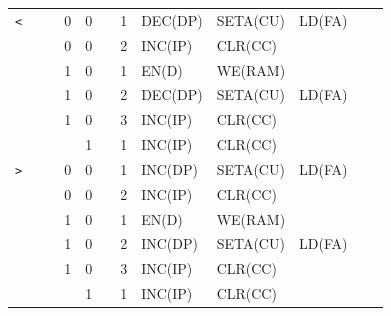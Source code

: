 \begin{footnotesize}
\begin{longtable}[c] {c|ccccc|c|lllll}
    \rowcolor{Gray}  \texttt{<}   &   &   & 0 & 0     &      & 1     & DEC(DP)   & SETA(CU) & LD(FA)  &        &                \\
    \rowcolor{Gray}               &   &   & 0 & 0     &      & 2     & INC(IP)  & CLR(CC)   &         &        &                \\    
    \rowcolor{White}              &   &   & 1 & 0     &      & 1     & EN(D)    & WE(RAM)  &         &        &                \\
    \rowcolor{White}              &   &   & 1 & 0     &      & 2     & DEC(DP)   & SETA(CU) & LD(FA)  &        &                \\
    \rowcolor{White}              &   &   & 1 & 0     &      & 3     & INC(IP)  & CLR(CC)   &         &        &                \\
    \rowcolor{Gray}               &   &   &   & 1     &      & 1     & INC(IP)  & CLR(CC)   &         &        &                \\ \hline

    \rowcolor{Gray}  \texttt{>}   &   &   & 0 & 0     &      & 1     & INC(DP)   & SETA(CU) & LD(FA)  &        &                \\
    \rowcolor{Gray}               &   &   & 0 & 0     &      & 2     & INC(IP)  & CLR(CC)   &         &        &                \\    
    \rowcolor{White}              &   &   & 1 & 0     &      & 1     & EN(D)    & WE(RAM)  &         &        &                \\
    \rowcolor{White}              &   &   & 1 & 0     &      & 2     & INC(DP)   & SETA(CU) & LD(FA)  &        &                \\
    \rowcolor{White}              &   &   & 1 & 0     &      & 3     & INC(IP)  & CLR(CC)   &         &        &                \\
    \rowcolor{Gray}               &   &   &   & 1     &      & 1     & INC(IP)  & CLR(CC)   &         &        &                \\ \hline


\end{longtable}
\end{footnotesize}
